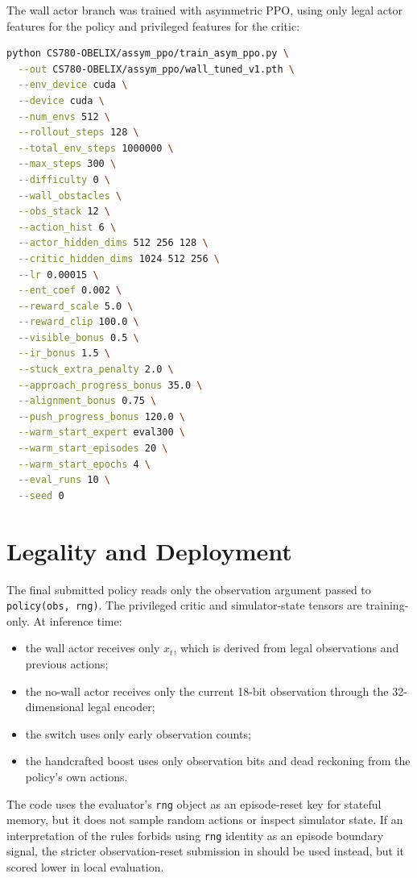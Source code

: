 \documentclass[11pt]{article}
\begin{document}
The wall actor branch was trained with asymmetric PPO, using only legal actor features
for the policy and privileged features for the critic:

\begin{lstlisting}[language=bash]
python CS780-OBELIX/assym_ppo/train_asym_ppo.py \
  --out CS780-OBELIX/assym_ppo/wall_tuned_v1.pth \
  --env_device cuda \
  --device cuda \
  --num_envs 512 \
  --rollout_steps 128 \
  --total_env_steps 1000000 \
  --max_steps 300 \
  --difficulty 0 \
  --wall_obstacles \
  --obs_stack 12 \
  --action_hist 6 \
  --actor_hidden_dims 512 256 128 \
  --critic_hidden_dims 1024 512 256 \
  --lr 0.00015 \
  --ent_coef 0.002 \
  --reward_scale 5.0 \
  --reward_clip 100.0 \
  --visible_bonus 0.5 \
  --ir_bonus 1.5 \
  --stuck_extra_penalty 2.0 \
  --approach_progress_bonus 35.0 \
  --alignment_bonus 0.75 \
  --push_progress_bonus 120.0 \
  --warm_start_expert eval300 \
  --warm_start_episodes 20 \
  --warm_start_epochs 4 \
  --eval_runs 10 \
  --seed 0
\end{lstlisting}

\section{Legality and Deployment}

The final submitted policy reads only the observation argument passed to
\texttt{policy(obs, rng)}.  The privileged critic and simulator-state tensors are
training-only.  At inference time:
\begin{itemize}
  \item the wall actor receives only \(x_t\), which is derived from legal observations
        and previous actions;
  \item the no-wall actor receives only the current 18-bit observation through the
        32-dimensional legal encoder;
  \item the switch uses only early observation counts;
  \item the handcrafted boost uses only observation bits and dead reckoning from the
        policy's own actions.
\end{itemize}
The code uses the evaluator's \texttt{rng} object as an episode-reset key for stateful
memory, but it does not sample random actions or inspect simulator state.  If an
interpretation of the rules forbids using \texttt{rng} identity as an episode boundary
signal, the stricter observation-reset submission in  should be used
instead, but it scored lower in local evaluation.
\end{document}
